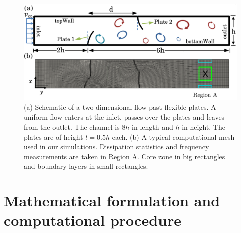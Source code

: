 \documentclass[aps,pre,twocolumn,aps,longbibliography]{revtex4-1}
\begin{document}
	
	\begin{figure}
		\begin{minipage}[c]{1\linewidth}
			\includegraphics[width=1\linewidth]{Fig01.pdf} 
		\end{minipage} 
		\caption{(a) Schematic of a two-dimensional flow past flexible plates. A uniform flow enters at the inlet, passes over the plates and leaves from the outlet. The channel is $8h$ in length and $h$ in height. The plates are of height $l= 0.5h$ each. (b) A typical computational mesh used in our simulations. Dissipation statistics and frequency measurements are taken in Region A. Core zone in big rectangles and boundary layers in small rectangles.
		}
		\label{fig:schematic}
	\end{figure}
	
	\section{Mathematical formulation and computational procedure}
	
\end{document}
